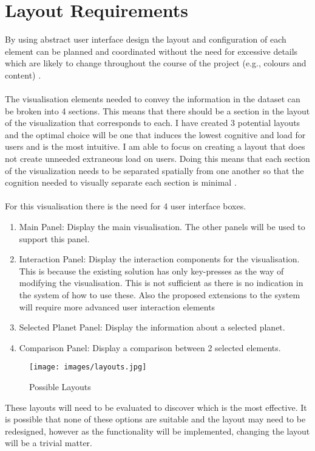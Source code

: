 \documentclass[11pt
              , a4paper
              , twoside
              , openright
              ]{report}
\begin{document}
\section{Layout Requirements}
By using abstract user interface design the layout and configuration of each
element can be planned and coordinated without the need for excessive details
which are likely to change throughout the course of the project (e.g., colours
and content) \cite{martin}.
\\\\
The visualisation elements needed to convey the information in the dataset can
be broken into 4 sections. This means that there should be a section in the
layout of the visualization that corresponds to each. I have created 3 potential
layouts and the optimal choice will be one that induces the lowest cognitive and
load for users and is the most intuitive.  I am able to focus on creating a
layout that does not create unneeded extraneous load \cite{InformationCapacity}
on users. Doing this means that each section of the visualization needs to be
separated spatially from one another so that the cognition needed to visually
separate each section is minimal \cite{mendel}.  
\\\\
For this visualisation there is the need for 4 user interface boxes. 
\begin{enumerate}
\item Main Panel: Display the main visualisation. The other panels will be used
to support this panel.
 \item Interaction Panel: Display the interaction components for the
visualisation. This is because the existing solution has only key-presses as the
way of modifying the visualisation. This is not sufficient as there is no
indication in the system of how to use these. Also the proposed extensions to
the system will require more advanced user interaction elements
\item Selected Planet Panel: Display the information about a selected planet.
\item Comparison Panel: Display a comparison between 2 selected elements.
\end{enumerate}
\begin{figure}[h!]
  \centering
      \texttt{[image: images/layouts.jpg]}
  \caption{Possible Layouts}
\end{figure}

These layouts will need to be evaluated to discover which is the most effective.
It is possible that none of these options are suitable and the layout may need
to be redesigned, however as the functionality will be implemented, changing the
layout will be a trivial matter. 
\end{document}
